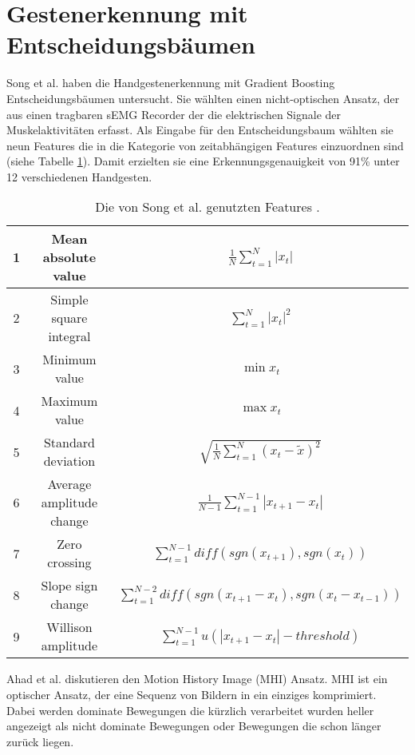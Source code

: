 \section{Gestenerkennung mit Entscheidungsbäumen}
\label{sec:sota_misc}
Song et al. \cite{song2019design} haben die Handgestenerkennung mit Gradient Boosting Entscheidungsbäumen untersucht. Sie wählten einen nicht-optischen Ansatz, der aus einen tragbaren sEMG Recorder
der die elektrischen Signale der Muskelaktivitäten erfasst. Als Eingabe für den Entscheidungsbaum wählten sie neun Features die in die Kategorie von zeitabhängigen Features einzuordnen sind
(siehe Tabelle \ref{tab:songFeatures}). Damit erzielten sie eine Erkennungsgenauigkeit von 91\% unter 12 verschiedenen Handgesten.
\begin{table}[h!]
    \centering
    \begin{tabular}{ c | c | c }
        \hline
        \hline
        1 & Mean absolute value & $\frac{1}{N}\sum^N_{t=1} |x_t|$ \\\hline
        2 & Simple square integral & $\sum^N_{t=1} |x_t|^2$ \\\hline
        3 & Minimum value & $\min x_t$ \\\hline
        4 & Maximum value & $\max x_t$ \\\hline
        5 & Standard deviation & $\sqrt{\frac{1}{N}\sum^N_{t=1}(x_t - \tilde{x})^2}$ \\\hline
        6 & Average amplitude change & $\frac{1}{N-1}\sum^{N-1}_{t=1} |x_{t + 1} - x_t|$ \\\hline
        7 & Zero crossing & $\sum^{N-1}_{t=1}diff(sgn(x_{t+1}),sgn(x_t))$ \\\hline
        8 & Slope sign change & $\sum^{N-2}_{t=1}diff(sgn(x_{t+1} - x_t),sgn(x_t - x_{t - 1}))$ \\\hline
        9 & Willison amplitude & $\sum^{N-1}_{t=1}u(|x_{t+1} - x_t| - threshold)$ \\
        \hline
        \hline
    \end{tabular}
    \caption{Die von Song et al. genutzten Features \cite{song2019design}.}
    \label{tab:songFeatures}
\end{table}
\newline
\newline
Ahad et al. \cite{ahad2012motion} diskutieren den Motion History Image (MHI) Ansatz. MHI ist ein optischer Ansatz, der eine Sequenz von Bildern in ein einziges komprimiert. Dabei werden dominate Bewegungen die
kürzlich verarbeitet wurden heller angezeigt als nicht dominate Bewegungen oder Bewegungen die schon länger zurück liegen.

